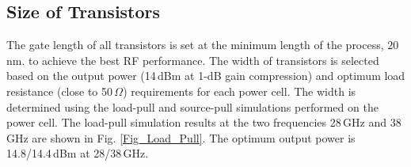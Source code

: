 \documentclass{IEEEtran}
\begin{document}





\subsection{Size of Transistors}
The gate length of all transistors is set at the minimum length of the process, 20\,nm. to achieve the best RF performance. The width of transistors is selected based on the output power (14\,dBm at 1-dB gain compression) and optimum load resistance (close to 50\,$\Omega$) requirements for each power cell. The width is determined using the load-pull and source-pull simulations performed on the power cell. The load-pull simulation results at the two frequencies 28\,GHz and 38\,GHz are shown in Fig. \ref{Fig_Load_Pull}. The optimum output power is 14.8/14.4\,dBm at 28/38\,GHz. 





\end{document}
